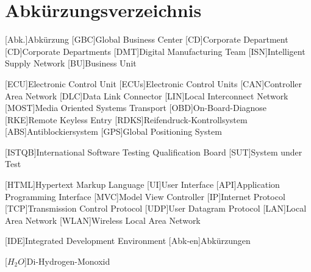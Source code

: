 
\chapter*{Abkürzungsverzeichnis}                   %

\begin{acronym}[DHBW]
 [Abk.]{Abkürzung}
 [GBC]{Global Business Center}
 [CD]{Corporate Department}
 [CD]{Corporate Departments}
 [DMT]{Digital Manufacturing Team}
 [ISN]{Intelligent Supply Network}
 [BU]{Business Unit}
 
 [ECU]{Electronic Control Unit}
 [ECUs]{Electronic Control Units}
 [CAN]{Controller Area Network}
 [DLC]{Data Link Connector}
 [LIN]{Local Interconnect Network}
 [MOST]{Media Oriented Systems Transport}
 [OBD]{On-Board-Diagnose} 
 [RKE]{Remote Keyless Entry}
 [RDKS]{Reifendruck-Kontrollsystem}
 [ABS]{Antiblockiersystem}
 [GPS]{Global Positioning System}
 
 [ISTQB]{International Software Testing Qualification Board}
 [SUT]{System under Test}
 
 [HTML]{Hypertext Markup Language}
 [UI]{User Interface}
 [API]{Application Programming Interface}
 [MVC]{Model View Controller}
 [IP]{Internet Protocol}
 [TCP]{Transmission Control Protocol}
 [UDP]{User Datagram Protocol}
 [LAN]{Local Area Network}
 [WLAN]{Wireless Local Area Network}
 
 

 [IDE]{Integrated Development Environment}
 [Abk-en]{Abkürzungen}

 [\ensuremath{H_2O}]{Di-Hydrogen-Monoxid}

\end{acronym}
